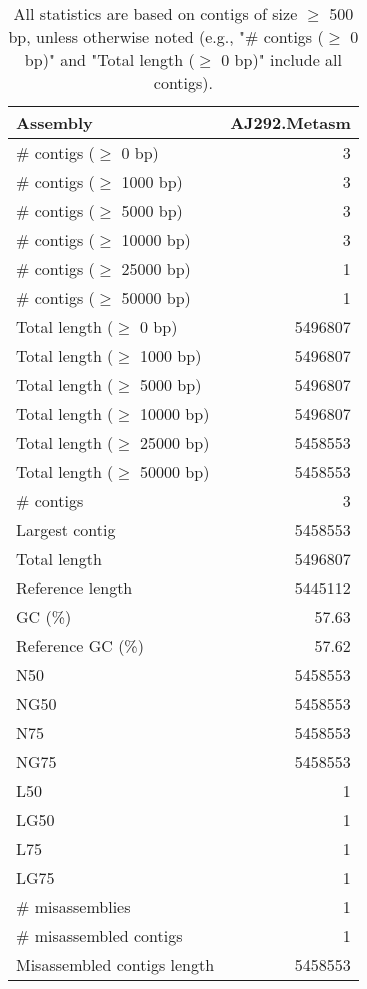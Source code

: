 \documentclass[12pt,a4paper]{article}
\begin{document}
\begin{table}[ht]
\begin{center}
\caption{All statistics are based on contigs of size $\geq$ 500 bp, unless otherwise noted (e.g., "\# contigs ($\geq$ 0 bp)" and "Total length ($\geq$ 0 bp)" include all contigs).}
\begin{tabular}{|l*{1}{|r}|}
\hline
Assembly & AJ292.Metasm \\ \hline
\# contigs ($\geq$ 0 bp) & 3 \\ \hline
\# contigs ($\geq$ 1000 bp) & 3 \\ \hline
\# contigs ($\geq$ 5000 bp) & 3 \\ \hline
\# contigs ($\geq$ 10000 bp) & 3 \\ \hline
\# contigs ($\geq$ 25000 bp) & 1 \\ \hline
\# contigs ($\geq$ 50000 bp) & 1 \\ \hline
Total length ($\geq$ 0 bp) & 5496807 \\ \hline
Total length ($\geq$ 1000 bp) & 5496807 \\ \hline
Total length ($\geq$ 5000 bp) & 5496807 \\ \hline
Total length ($\geq$ 10000 bp) & 5496807 \\ \hline
Total length ($\geq$ 25000 bp) & 5458553 \\ \hline
Total length ($\geq$ 50000 bp) & 5458553 \\ \hline
\# contigs & 3 \\ \hline
Largest contig & 5458553 \\ \hline
Total length & 5496807 \\ \hline
Reference length & 5445112 \\ \hline
GC (\%) & 57.63 \\ \hline
Reference GC (\%) & 57.62 \\ \hline
N50 & 5458553 \\ \hline
NG50 & 5458553 \\ \hline
N75 & 5458553 \\ \hline
NG75 & 5458553 \\ \hline
L50 & 1 \\ \hline
LG50 & 1 \\ \hline
L75 & 1 \\ \hline
LG75 & 1 \\ \hline
\# misassemblies & 1 \\ \hline
\# misassembled contigs & 1 \\ \hline
Misassembled contigs length & 5458553 \\ \hline

\end{tabular}
\end{center}
\end{table}
\end{document}
